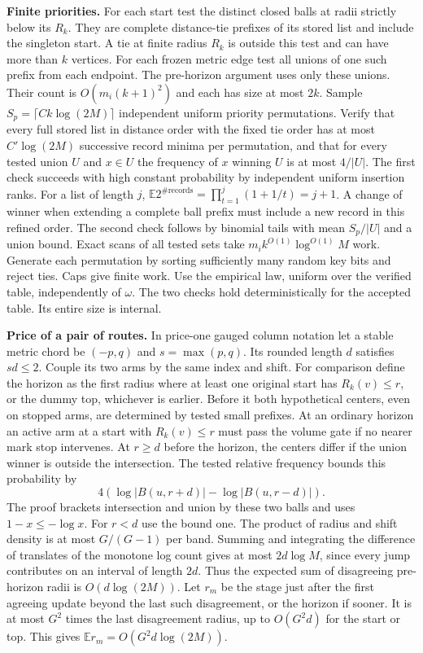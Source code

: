 \documentclass[11pt]{article}
\begin{document}
\textbf{Finite priorities.} For each start test the distinct closed balls at radii strictly below its \(R_k\). They are complete distance-tie prefixes of its stored list and include the singleton start. A tie at finite radius \(R_k\) is outside this test and can have more than \(k\) vertices. For each frozen metric edge test all unions of one such prefix from each endpoint. The pre-horizon argument uses only these unions. Their count is \(O(m_i(k+1)^2)\) and each has size at most \(2k\). Sample \(S_p=\lceil C k\log(2M)\rceil\) independent uniform priority permutations. Verify that every full stored list in distance order with the fixed tie order has at most \(C'\log(2M)\) successive record minima per permutation, and that for every tested union \(U\) and \(x\in U\) the frequency of \(x\) winning \(U\) is at most \(4/|U|\). The first check succeeds with high constant probability by independent uniform insertion ranks. For a list of length \(j\), \(\mathbb E 2^{\#\mathrm{records}}=\prod_{t=1}^j(1+1/t)=j+1\). A change of winner when extending a complete ball prefix must include a new record in this refined order. The second check follows by binomial tails with mean \(S_p/|U|\) and a union bound. Exact scans of all tested sets take \(m_i k^{O(1)}\log^{O(1)}M\) work. Generate each permutation by sorting sufficiently many random key bits and reject ties. Caps give finite work. Use the empirical law, uniform over the verified table, independently of \(\omega\). The two checks hold deterministically for the accepted table. Its entire size is internal.

\textbf{Price of a pair of routes.} In price-one gauged column notation let a stable metric chord be \((-p,q)\) and \(s=\max(p,q)\). Its rounded length \(d\) satisfies \(sd\le2\). Couple its two arms by the same index and shift. For comparison define the horizon as the first radius where at least one original start has \(R_k(v)\le r\), or the dummy top, whichever is earlier. Before it both hypothetical centers, even on stopped arms, are determined by tested small prefixes. At an ordinary horizon an active arm at a start with \(R_k(v)\le r\) must pass the volume gate if no nearer mark stop intervenes. At \(r\ge d\) before the horizon, the centers differ if the union winner is outside the intersection. The tested relative frequency bounds this probability by
\[
 4(\log |B(u,r+d)|-\log |B(u,r-d)|).
\]
The proof brackets intersection and union by these two balls and uses \(1-x\le-\log x\). For \(r<d\) use the bound one. The product of radius and shift density is at most \(G/(G-1)\) per band. Summing and integrating the difference of translates of the monotone log count gives at most \(2d\log M\), since every jump contributes on an interval of length \(2d\). Thus the expected sum of disagreeing pre-horizon radii is \(O(d\log(2M))\). Let \(r_m\) be the stage just after the first agreeing update beyond the last such disagreement, or the horizon if sooner. It is at most \(G^2\) times the last disagreement radius, up to \(O(G^2d)\) for the start or top. This gives \(\mathbb E r_m=O(G^2d\log(2M))\).
\end{document}
